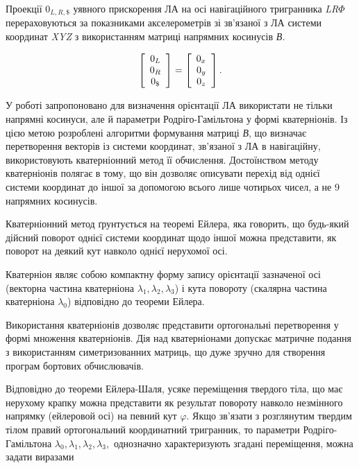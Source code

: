 Проекції \textit{$0_{L,R,\$ } $ }уявного прискорення ЛА на осі навігаційного тригранника \textit{LR$\Phi $ }перераховуються 
за показниками акселерометрів зі зв'язаної з ЛА системи координат \textit{XYZ  }з 
використанням матриці напрямних косинусів \textit{В.}

\[\left[\begin{array}{c} {0_{L} } \\ {0_{R} } \\ {0_{\$ } } \end{array}\right]=\left[
\begin{array}{c} {0_{x_{{\rm }} } } \\ {0_{y_{{\rm }} } } \\ {0_{z_{{\rm }} } } \end{array}
\right].\] 

У роботі запропоновано для визначення орієнтації ЛА використати не тільки напрямні 
косинуси, але й параметри Родріго-Гамільтона у формі кватерніонів.  Із цією метою 
розроблені алгоритми формування матриці \textit{В}, що визначає перетворення векторів 
із системи координат, зв'язаної з ЛА в навігаційну, використовують кватерніонний 
метод її обчислення. Достоїнством методу кватерніонів полягає в тому, що він дозволяє 
описувати перехід від однієї системи координат до іншої за допомогою всього лише 
чотирьох чисел, а не 9 напрямних косинусів.

Кватерніонний метод ґрунтується  на теоремі Ейлера, яка говорить, що будь-який дійсний 
поворот однієї системи координат щодо іншої можна представити, як поворот на деякий 
кут навколо однієї нерухомої осі.

Кватерніон являє собою компактну форму запису орієнтації зазначеної осі (векторна 
частина кватерніона $\lambda_{1} ,\lambda_{2} ,\lambda_{3} $) і кута повороту 
(скалярна частина кватерніона $\lambda_{0} $) відповідно до теореми Ейлера.

Використання кватерніонів дозволяє представити ортогональні перетворення у формі 
множення кватерніонів. Дія над кватерніонами допускає матричне подання з використанням 
симетризованних матриць, що дуже зручно для створення програм бортових обчислювачів. 

Відповідно 
до теореми Ейлера-Шаля, усяке переміщення твердого тіла, що має нерухому крапку можна 
представити як результат повороту навколо незмінного напрямку (ейлеровой осі) на 
певний кут $\varphi $. Якщо зв'язати з розглянутим твердим тілом правий ортогональний 
координатний тригранник, то параметри Родріго-Гамільтона $\lambda_{0} ,\lambda_{1} 
,\lambda_{2} ,\lambda_{3} ,$ однозначно характеризують згадані переміщення, можна 
задати виразами 

